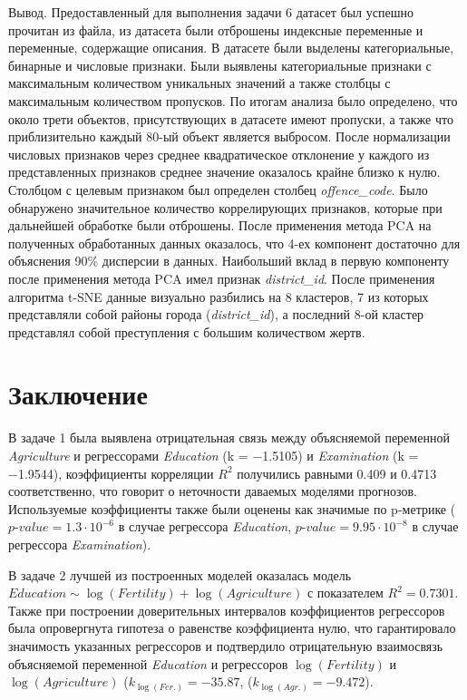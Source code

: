 Вывод. Предоставленный для выполнения задачи 6 датасет был успешно прочитан из файла, из датасета были отброшены индексные переменные и переменные, содержащие описания. В датасете были выделены категориальные, бинарные и числовые признаки. Были выявлены категориальные признаки с максимальным количеством уникальных значений а также столбцы с максимальным количеством пропусков. По итогам анализа было определено, что около трети объектов, присутствующих в датасете имеют пропуски, а также что приблизительно каждый 80-ый объект является выбросом. После нормализации числовых признаков через среднее квадратическое отклонение у каждого из представленных признаков среднее значение оказалось крайне близко к нулю. Столбцом с целевым признаком был определен столбец \textit{offence\_code}. Было обнаружено значительное количество коррелирующих признаков, которые при дальнейшей обработке были отброшены. После применения метода PCA на полученных обработанных данных оказалось, что 4-ех компонент достаточно для объяснения 90\% дисперсии в данных. Наибольший вклад в первую компоненту после применения метода PCA имел признак \textit{district\_id}. После применения алгоритма t-SNE данные визуально разбились на 8 кластеров, 7 из которых представляли собой районы города (\textit{district\_id}), а последний 8-ой кластер представлял собой преступления с большим количеством жертв.


\newpage
{}
\section{Заключение}

В задаче 1 была выявлена отрицательная связь между объясняемой переменной \textit{Agriculture} и регрессорами \textit{Education} (k = −1.5105) и \textit{Examination} (k = −1.9544), коэффициенты корреляции $R^2$ получились равными 0.409 и 0.4713 соответственно, что говорит о неточности даваемых моделями прогнозов. Используемые коэффициенты также были оценены как значимые по p-метрике ($\textit{p-value} = 1.3 \cdot 10^{-6}$ в случае регрессора \textit{Education}, $\textit{p-value} = 9.95 \cdot 10^{-8}$ в случае регрессора \textit{Examination}).

В задаче 2 лучшей из построенных моделей оказалась модель $\textit{Education}\sim\log(\textit{Fertility})+\log(\textit{Agriculture})$ с показателем $R^2 = 0.7301$. Также при построении доверительных интервалов коэффициентов регрессоров была опровергнута гипотеза о равенстве коэффициента  нулю, что гарантировало значимость указанных регрессоров и подтвердило отрицательную взаимосвязь объясняемой переменной \textit{Education} и регрессоров $\log(\textit{Fertility})$ и $\log(\textit{Agriculture})$ ($k_{\log(\textit{Fer.})} = −35.87$, ($k_{\log(\textit{Agr.})} = −9.472$).

